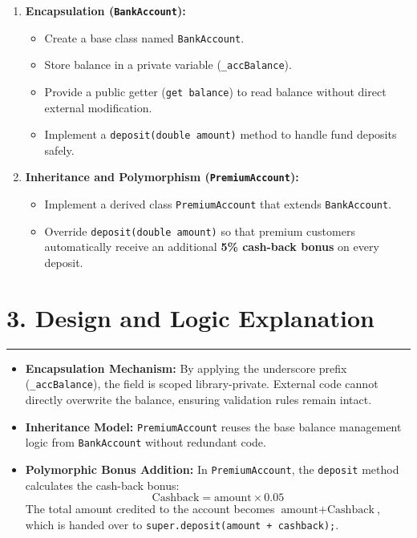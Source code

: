 \documentclass[11pt,a4paper]{article}
\begin{document}
\begin{enumerate}
    \setlength{\itemsep}{7pt}
    \item \textbf{Encapsulation (\texttt{BankAccount}):}
    \begin{itemize}
        \item Create a base class named \texttt{BankAccount}.
        \item Store balance in a private variable (\texttt{\_accBalance}).
        \item Provide a public getter (\texttt{get balance}) to read balance without direct external modification.
        \item Implement a \texttt{deposit(double amount)} method to handle fund deposits safely.
    \end{itemize}
    \item \textbf{Inheritance and Polymorphism (\texttt{PremiumAccount}):}
    \begin{itemize}
        \item Implement a derived class \texttt{PremiumAccount} that extends \texttt{BankAccount}.
        \item Override \texttt{deposit(double amount)} so that premium customers automatically receive an additional \textbf{5\% cash-back bonus} on every deposit.
    \end{itemize}
\end{enumerate}

\vspace{0.35cm}
\section*{3. Design and Logic Explanation}
\noindent\rule{\textwidth}{0.5pt}\vspace{0.15cm}

\begin{itemize}
    \setlength{\itemsep}{4pt}
    \item \textbf{Encapsulation Mechanism:} By applying the underscore prefix (\texttt{\_accBalance}), the field is scoped library-private. External code cannot directly overwrite the balance, ensuring validation rules remain intact.
    \item \textbf{Inheritance Model:} \texttt{PremiumAccount} reuses the base balance management logic from \texttt{BankAccount} without redundant code.
    \item \textbf{Polymorphic Bonus Addition:} In \texttt{PremiumAccount}, the \texttt{deposit} method calculates the cash-back bonus:
    \[
        \text{Cashback} = \text{amount} \times 0.05
    \]
    The total amount credited to the account becomes $\text{amount} + \text{Cashback}$, which is handed over to \texttt{super.deposit(amount + cashback);}.
\end{itemize}
\end{document}
